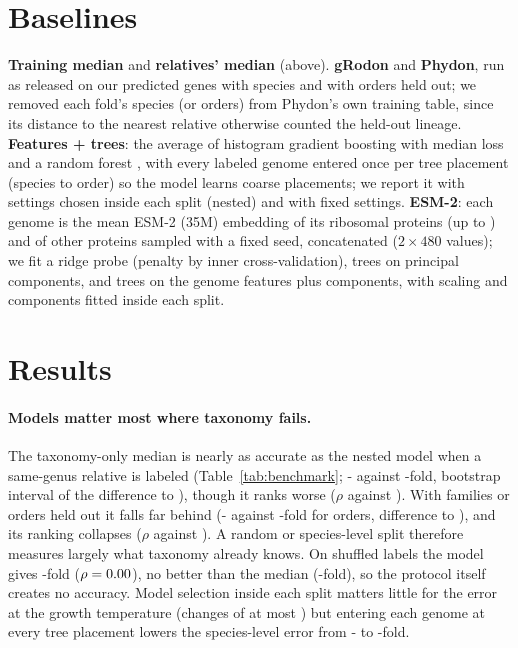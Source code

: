 \documentclass{article}
\begin{document}
\section{Baselines}\label{sec:baselines}
\textbf{Training median} and \textbf{relatives' median} (above). \textbf{gRodon} and \textbf{Phydon}, run as released on
our predicted genes with species and with orders held out; we removed each fold's species (or orders) from Phydon's own
training table, since its distance to the nearest relative otherwise counted the held-out lineage. \textbf{Features + trees}: the average of
histogram gradient boosting with median loss \citep{friedman2001} and a random forest \citep{breiman2001}, with every
labeled genome entered once per tree placement (species to order) so the model learns coarse placements; we report it with
settings chosen inside each split (nested) and with fixed settings. \textbf{ESM-2}: each genome is the mean ESM-2 (35M)
embedding \citep{lin2023} of its ribosomal proteins (up to \EsmNRibosomal) and of \EsmNOther other proteins sampled with a
fixed seed, concatenated ($2\times 480$ values); we fit a ridge probe (penalty by inner cross-validation), trees on
\EsmPCTrees principal components, and trees on the genome features plus \EsmPCComb components, with scaling and components
fitted inside each split.

\section{Results}\label{sec:results}


\paragraph{Models matter most where taxonomy fails.} The taxonomy-only median is nearly as accurate as the nested model when
a same-genus relative is labeled (Table~\ref{tab:benchmark}; \BaseRelErrSameGenus- against \ErrSameGenus-fold, bootstrap
interval of the difference \CIDiffLoSameGenus to \CIDiffHiSameGenus), though it ranks worse ($\rho$ \BaseRelRhoSameGenus
against \RhoSameGenus). With families or orders held out it falls far behind (\BaseRelErrNewOrder- against
\ErrNewOrder-fold for orders, difference \CIDiffLoNewOrder to \CIDiffHiNewOrder), and its ranking collapses ($\rho$
\BaseRelRhoNewOrder against \RhoNewOrder). A random or species-level split therefore measures largely what taxonomy already
knows. On shuffled labels the model gives \ShuffleErrSpecies-fold ($\rho=0.00$), no better than the median
(\ShuffleMedErrSpecies-fold), so the protocol itself creates no accuracy. Model selection inside each split matters little
for the error at the growth temperature (changes of at most \SelectMaxDiff) but entering each genome at every tree placement lowers
the species-level error from \FixedErrSameGenus- to \CoarseErrSameGenus-fold.
\end{document}
